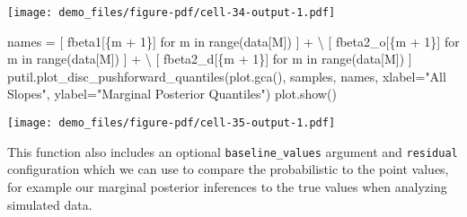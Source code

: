 \documentclass[
  letterpaper,
  DIV=11,
  numbers=noendperiod]{scrartcl}
\newenvironment{Shaded}{\begin{snugshade}}{\end{snugshade}}
\newcommand{\BuiltInTok}[1]{\textcolor[rgb]{0.00,0.23,0.31}{#1}}
\newcommand{\ControlFlowTok}[1]{\textcolor[rgb]{0.00,0.23,0.31}{#1}}
\newcommand{\DecValTok}[1]{\textcolor[rgb]{0.68,0.00,0.00}{#1}}
\newcommand{\KeywordTok}[1]{\textcolor[rgb]{0.00,0.23,0.31}{#1}}
\newcommand{\NormalTok}[1]{\textcolor[rgb]{0.00,0.23,0.31}{#1}}
\newcommand{\OperatorTok}[1]{\textcolor[rgb]{0.37,0.37,0.37}{#1}}
\newcommand{\SpecialCharTok}[1]{\textcolor[rgb]{0.37,0.37,0.37}{#1}}
\newcommand{\SpecialStringTok}[1]{\textcolor[rgb]{0.13,0.47,0.30}{#1}}
\newcommand{\StringTok}[1]{\textcolor[rgb]{0.13,0.47,0.30}{#1}}
\begin{document}
\texttt{[image: demo\_files/figure-pdf/cell-34-output-1.pdf]}

\begin{Shaded}
\begin{Highlighting}[]
\NormalTok{names }\OperatorTok{=}\NormalTok{ [ }\SpecialStringTok{f\textquotesingle{}beta1[}\SpecialCharTok{\{}\NormalTok{m }\OperatorTok{+} \DecValTok{1}\SpecialCharTok{\}}\SpecialStringTok{]\textquotesingle{}} \ControlFlowTok{for}\NormalTok{ m }\KeywordTok{in} \BuiltInTok{range}\NormalTok{(data[}\StringTok{\textquotesingle{}M\textquotesingle{}}\NormalTok{]) ] }\OperatorTok{+} \OperatorTok{\textbackslash{}}
\NormalTok{        [ }\SpecialStringTok{f\textquotesingle{}beta2\_o[}\SpecialCharTok{\{}\NormalTok{m }\OperatorTok{+} \DecValTok{1}\SpecialCharTok{\}}\SpecialStringTok{]\textquotesingle{}} \ControlFlowTok{for}\NormalTok{ m }\KeywordTok{in} \BuiltInTok{range}\NormalTok{(data[}\StringTok{\textquotesingle{}M\textquotesingle{}}\NormalTok{]) ] }\OperatorTok{+} \OperatorTok{\textbackslash{}}
\NormalTok{        [ }\SpecialStringTok{f\textquotesingle{}beta2\_d[}\SpecialCharTok{\{}\NormalTok{m }\OperatorTok{+} \DecValTok{1}\SpecialCharTok{\}}\SpecialStringTok{]\textquotesingle{}} \ControlFlowTok{for}\NormalTok{ m }\KeywordTok{in} \BuiltInTok{range}\NormalTok{(data[}\StringTok{\textquotesingle{}M\textquotesingle{}}\NormalTok{]) ]}
\NormalTok{putil.plot\_disc\_pushforward\_quantiles(plot.gca(), samples, names,}
\NormalTok{                                      xlabel}\OperatorTok{=}\StringTok{"All Slopes"}\NormalTok{,}
\NormalTok{                                      ylabel}\OperatorTok{=}\StringTok{"Marginal Posterior Quantiles"}\NormalTok{)}
\NormalTok{plot.show()}
\end{Highlighting}
\end{Shaded}

\texttt{[image: demo\_files/figure-pdf/cell-35-output-1.pdf]}

This function also includes an optional \texttt{baseline\_values}
argument and \texttt{residual} configuration which we can use to compare
the probabilistic to the point values, for example our marginal
posterior inferences to the true values when analyzing simulated data.
\end{document}
